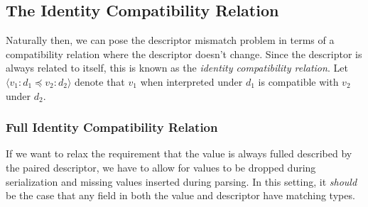 \subsection{The Identity Compatibility Relation}\label{sec:id-compat}
Naturally then, we can pose the descriptor mismatch problem in terms of a
compatibility relation where the descriptor doesn't change. Since the descriptor
is always related to itself, this is known as the \emph{identity compatibility
  relation}. Let $\langle v_1 : d_1 \preceq v_2 : d_2 \rangle$ denote that $v_1$
when interpreted under $d_1$ is compatible with $v_2$ under $d_2$.


\subsubsection{Full Identity Compatibility Relation}\label{sec:full-id-compat}
If we want to relax the requirement that the value is always fulled described by
the paired descriptor, we have to allow for values to be dropped during
serialization and missing values inserted during parsing. In this setting, it
\emph{should} be the case that any field in both the value and descriptor have
matching types.

